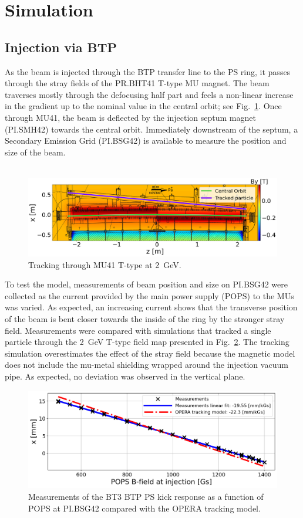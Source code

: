 \section{Simulation}
\label{section:simulation}

\subsection{Injection via BTP}
As the beam is injected through the BTP transfer line to the PS ring, it passes through the stray fields of the PR.BHT41 T-type MU magnet. The beam traverses mostly through the defocusing half part and feels a non-linear increase in the gradient up to the nominal value in the central orbit; see Fig.~\ref{fig:injection_btp}. Once through MU41, the beam is deflected by the injection septum magnet (PI.SMH42) towards the central orbit. Immediately downstream of the septum, a Secondary Emission Grid (PI.BSG42) is available to measure the position and size of the beam.
\\
\\
\begin{figure}[!htb]
   \centering
   \includegraphics*[width=0.7\columnwidth]{01_Introduction/images/injection_tracking.png}
   \caption{Tracking through MU41 T-type at \SI{2}{GeV}.}
   \label{fig:injection_btp}
\end{figure}

To test the model, measurements of beam position and size on PI.BSG42 were collected as the current provided by the main power supply (POPS) to the MUs was varied. As expected, an increasing current shows that the transverse position of the beam is bent closer towards the inside of the ring by the stronger stray field. Measurements were compared with simulations that tracked a single particle through the \SI{2}{GeV} T-type field map presented in Fig.~\ref{fig:injection_btp_transverse_position}. The tracking simulation overestimates the effect of the stray field because the magnetic model does not include the mu-metal shielding wrapped around the injection vacuum pipe. As expected, no deviation was observed in the vertical plane.

\begin{figure}[!htb]
   \centering
   \includegraphics*[width=0.7\columnwidth]{01_Introduction/images/injection_measurement.png}
   \caption{Measurements of the BT3 BTP PS kick response as a function of POPS at PI.BSG42 compared with the OPERA tracking model.}
   \label{fig:injection_btp_transverse_position}
\end{figure}

